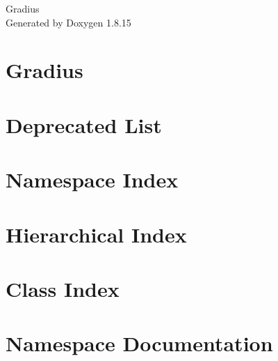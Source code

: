 \documentclass[twoside]{book}
\newcommand{\+}{\discretionary{\mbox{\scriptsize$\hookleftarrow$}}{}{}}
\newcommand{\clearemptydoublepage}{%
  \newpage{\pagestyle{empty}\cleardoublepage}%
}
\begin{document}
\hypersetup{pageanchor=false,
             bookmarksnumbered=true,
             pdfencoding=unicode
            }
\begin{titlepage}
\vspace*{7cm}
\begin{center}%
{\Large Gradius }\\
\vspace*{1cm}
{\large Generated by Doxygen 1.8.15}\\
\end{center}
\end{titlepage}
\clearemptydoublepage
{}
\tableofcontents
\clearemptydoublepage
{}
\hypersetup{pageanchor=true}

\chapter{Gradius}
\label{md__r_e_a_d_m_e}

\chapter{Deprecated List}
\label{deprecated}

\chapter{Namespace Index}

\chapter{Hierarchical Index}

\chapter{Class Index}

\chapter{Namespace Documentation}


\end{document}
